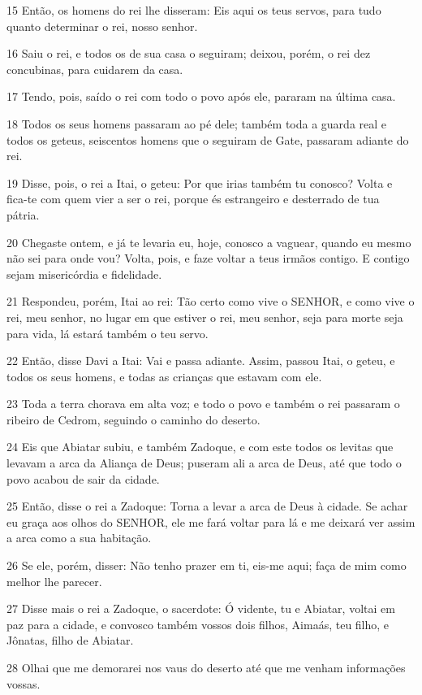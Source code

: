 \par 15 Então, os homens do rei lhe disseram: Eis aqui os teus servos, para tudo quanto determinar o rei, nosso senhor.
\par 16 Saiu o rei, e todos os de sua casa o seguiram; deixou, porém, o rei dez concubinas, para cuidarem da casa.
\par 17 Tendo, pois, saído o rei com todo o povo após ele, pararam na última casa.
\par 18 Todos os seus homens passaram ao pé dele; também toda a guarda real e todos os geteus, seiscentos homens que o seguiram de Gate, passaram adiante do rei.
\par 19 Disse, pois, o rei a Itai, o geteu: Por que irias também tu conosco? Volta e fica-te com quem vier a ser o rei, porque és estrangeiro e desterrado de tua pátria.
\par 20 Chegaste ontem, e já te levaria eu, hoje, conosco a vaguear, quando eu mesmo não sei para onde vou? Volta, pois, e faze voltar a teus irmãos contigo. E contigo sejam misericórdia e fidelidade.
\par 21 Respondeu, porém, Itai ao rei: Tão certo como vive o SENHOR, e como vive o rei, meu senhor, no lugar em que estiver o rei, meu senhor, seja para morte seja para vida, lá estará também o teu servo.
\par 22 Então, disse Davi a Itai: Vai e passa adiante. Assim, passou Itai, o geteu, e todos os seus homens, e todas as crianças que estavam com ele.
\par 23 Toda a terra chorava em alta voz; e todo o povo e também o rei passaram o ribeiro de Cedrom, seguindo o caminho do deserto.
\par 24 Eis que Abiatar subiu, e também Zadoque, e com este todos os levitas que levavam a arca da Aliança de Deus; puseram ali a arca de Deus, até que todo o povo acabou de sair da cidade.
\par 25 Então, disse o rei a Zadoque: Torna a levar a arca de Deus à cidade. Se achar eu graça aos olhos do SENHOR, ele me fará voltar para lá e me deixará ver assim a arca como a sua habitação.
\par 26 Se ele, porém, disser: Não tenho prazer em ti, eis-me aqui; faça de mim como melhor lhe parecer.
\par 27 Disse mais o rei a Zadoque, o sacerdote: Ó vidente, tu e Abiatar, voltai em paz para a cidade, e convosco também vossos dois filhos, Aimaás, teu filho, e Jônatas, filho de Abiatar.
\par 28 Olhai que me demorarei nos vaus do deserto até que me venham informações vossas.
